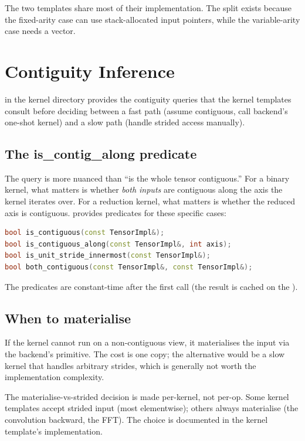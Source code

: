 The two templates share most of their implementation. The split
exists because the fixed-arity case can use stack-allocated input
pointers, while the variable-arity case needs a vector.

\section{Contiguity Inference}
\label{sec:kernel_abstraction:contig}

 in the kernel directory provides the contiguity
queries that the kernel templates consult before deciding between
a fast path (assume contiguous, call backend's one-shot kernel)
and a slow path (handle strided access manually).

\subsection{The is\_contig\_along predicate}
\label{ssec:kernel_abstraction:is_contig_along}

The query is more nuanced than ``is the whole tensor contiguous.''
For a binary kernel, what matters is whether \emph{both inputs} are
contiguous along the axis the kernel iterates over. For a reduction
kernel, what matters is whether the reduced axis is contiguous.
 provides predicates for these specific cases:

\begin{lstlisting}[style=lucidcpp,language=C++]
bool is_contiguous(const TensorImpl&);
bool is_contiguous_along(const TensorImpl&, int axis);
bool is_unit_stride_innermost(const TensorImpl&);
bool both_contiguous(const TensorImpl&, const TensorImpl&);
\end{lstlisting}

The predicates are constant-time after the first call (the result
is cached on the ).

\subsection{When to materialise}
\label{ssec:kernel_abstraction:materialise}

If the kernel cannot run on a non-contiguous view, it materialises
the input via the backend's  primitive. The cost
is one copy; the alternative would be a slow kernel that handles
arbitrary strides, which is generally not worth the implementation
complexity.

The materialise-vs-strided decision is made per-kernel, not
per-op. Some kernel templates accept strided input (most
elementwise); others always materialise (the convolution backward,
the FFT). The choice is documented in the kernel template's
implementation.

